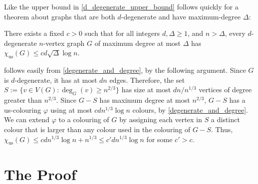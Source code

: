 \documentclass{patmorin}
\newcommand{\trn}{\chi_{\mathrm{us}}}
\begin{document}
Like the upper bound in \cite{karpas.neiman.ea:on} \cref{d_degenerate_upper_bound} follows quickly for a theorem about graphs that are both $d$-degenerate and have maximum-degree $\Delta$:

\begin{thm}\label{degenerate_and_degree}
  There exists a fixed $c>0$ such that
  for all integers $d,\Delta \ge 1$, and $n> \Delta$, every $d$-degenerate $n$-vertex graph $G$ of maximum degree at most $\Delta$ has
  $\trn(G)\leq c d\sqrt{\Delta}\log  n$.
\end{thm}

 follows easily from \cref{degenerate_and_degree}, by the following argument.  Since $G$ is $d$-degenerate, it has at most $dn$ edges.  Therefore, the set $S:=\{v\in V(G):\deg_G(v)\ge n^{2/3}\}$ has size at most $dn/n^{1/3}$ vertices of degree greater than $n^{2/3}$.  Since $G-S$ has maximum degree at most $n^{2/3}$, $G-S$ has a us-colouring $\varphi$ using at most $cdn^{1/3}\log  n$ colours, by \cref{degenerate_and_degree}. We can extend $\varphi$ to a colouring of $G$ by assigning each vertex in $S$ a distinct colour that is larger than any colour used in the colouring of $G-S$.  Thus, $\trn(G)\le cdn^{1/3}\log  n+n^{1/3}\le c'dn^{1/3}\log  n$ for some $c'>c$.


\section{The Proof}
\end{document}
